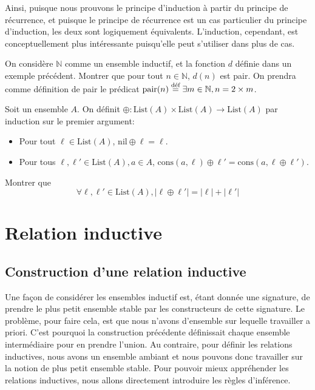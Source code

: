 Ainsi, puisque nous prouvons le principe d'induction à partir du principe de
récurrence, et puisque le principe de récurrence est un cas particulier du
principe d'induction, les deux sont logiquement équivalents. L'induction,
cependant, est conceptuellement plus intéressante puisqu'elle peut s'utiliser
dans plus de cas.

\begin{exercise}
  On considère $\mathbb N$ comme un ensemble inductif, et la fonction $d$
  définie dans un exemple précédent. Montrer que pour tout $n \in \mathbb N$,
  $d(n)$ est pair. On prendra comme définition de pair le prédicat
  $\mathrm{pair}(n) \defeq \exists m\in\mathbb N, n = 2 \times m$.
\end{exercise}

\begin{exercise}
  Soit un ensemble $A$. On définit
  $\oplus : \mathrm{List}(A) \times \mathrm{List}(A)\to \mathrm{List}(A)$ par
  induction sur le premier argument:
  \begin{itemize}
  \item Pour tout $\ell\in \mathrm{List}(A)$, $\mathrm{nil} \oplus \ell = \ell$.
  \item Pour tous $\ell,\ell'\in\mathrm{List}(A), a\in A$,
    $\mathrm{cons}(a,\ell) \oplus \ell' = \mathrm{cons}(a,\ell \oplus \ell')$.
  \end{itemize}

  Montrer que
  $$\forall \ell,\ell'\in \mathrm{List}(A), |\ell\oplus \ell'|=|\ell|+|\ell'|$$
\end{exercise}

\section{Relation inductive}

\subsection{Construction d'une relation inductive}

Une façon de considérer les ensembles inductif est, étant donnée une signature,
de prendre le plus petit ensemble stable par les constructeurs de cette
signature. Le problème, pour faire cela, est que nous n'avons d'ensemble sur
lequelle travailler a priori. C'est pourquoi la construction précédente
définissait chaque ensemble intermédiaire pour en prendre l'union. Au contraire,
pour définir les relations inductives, nous avons un ensemble ambiant et nous
pouvons donc travailler sur la notion de plus petit ensemble stable. Pour
pouvoir mieux appréhender les relations inductives, nous allons directement
introduire les règles d'inférence.

